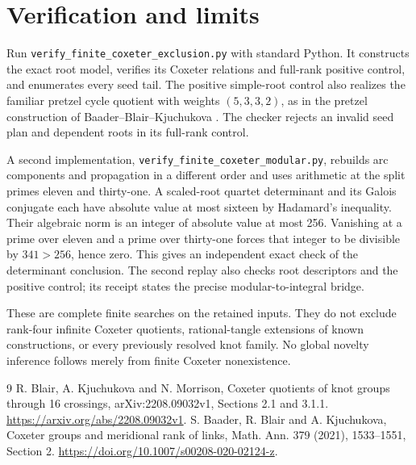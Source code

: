 \documentclass[11pt]{article}
\begin{document}
\section{Verification and limits}

Run \texttt{verify\_finite\_coxeter\_exclusion.py} with standard Python.
It constructs the exact root model, verifies its Coxeter relations
and full-rank positive control, and enumerates every seed tail.
The positive simple-root control also realizes the familiar pretzel
cycle quotient with weights $(5,3,3,2)$, as in the pretzel construction
of Baader--Blair--Kjuchukova \cite[Section 2]{bbk}.
The checker rejects an invalid seed plan and dependent roots in its
full-rank control.

A second implementation, \texttt{verify\_finite\_coxeter\_modular.py},
rebuilds arc components and propagation in a different order and
uses arithmetic at the split primes eleven and thirty-one.
A scaled-root quartet determinant and its Galois conjugate each
have absolute value at most sixteen by Hadamard's inequality.
Their algebraic norm is an integer of absolute value at most 256.
Vanishing at a prime over eleven and a prime over thirty-one forces
that integer to be divisible by $341>256$, hence zero. This gives
an independent exact check of the determinant conclusion.
The second replay also checks root descriptors and the positive
control; its receipt states the precise modular-to-integral bridge.

These are complete finite searches on the retained inputs.
They do not exclude rank-four infinite Coxeter quotients,
rational-tangle extensions of known constructions, or every
previously resolved knot family. No global novelty inference follows
merely from finite Coxeter nonexistence.

\begin{thebibliography}{9}
 R. Blair, A. Kjuchukova and N. Morrison,
Coxeter quotients of knot groups through 16 crossings,
arXiv:2208.09032v1, Sections 2.1 and 3.1.1.
\url{https://arxiv.org/abs/2208.09032v1}.
 S. Baader, R. Blair and A. Kjuchukova,
Coxeter groups and meridional rank of links,
Math. Ann. 379 (2021), 1533--1551, Section 2.
\url{https://doi.org/10.1007/s00208-020-02124-z}.
\end{thebibliography}
\end{document}
